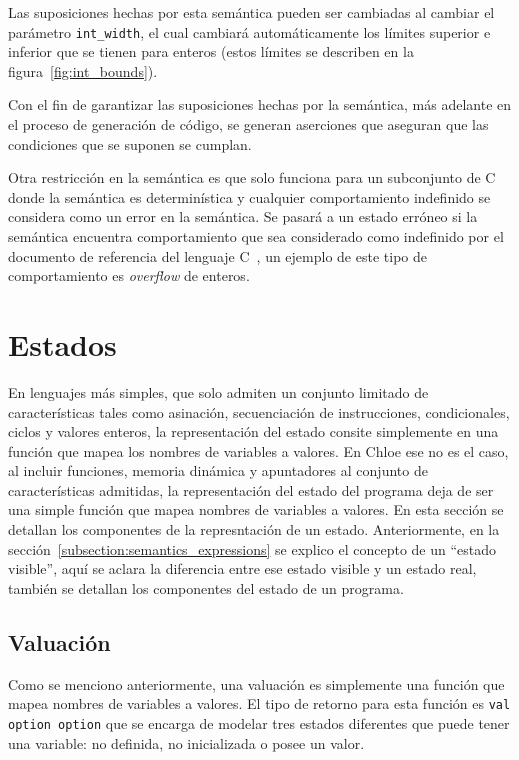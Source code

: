 Las suposiciones hechas por esta semántica pueden ser cambiadas al cambiar el parámetro \verb|int_width|, el cual cambiará automáticamente los límites superior e inferior que se tienen para enteros (estos límites se describen en la figura~\ref{fig:int_bounds}).

Con el fin de garantizar las suposiciones hechas por la semántica, más adelante en el proceso de generación de código, se generan aserciones que aseguran que las condiciones que se suponen se cumplan.

Otra restricción en la semántica es que solo funciona para un subconjunto de C donde la semántica es determinística y cualquier comportamiento indefinido se considera como un error en la semántica.
Se pasará a un estado erróneo si la semántica encuentra comportamiento que sea considerado como indefinido por el documento de referencia del lenguaje C~\cite{c99}, un ejemplo de este tipo de comportamiento es \textit{overflow} de enteros.


\section{Estados}\label{section:states}

En lenguajes más simples, que solo admiten un conjunto limitado de características tales como asinación, secuenciación de instrucciones, condicionales, ciclos y valores enteros, la representación del estado consite simplemente en una función que mapea los nombres de variables a valores.
En Chloe ese no es el caso, al incluir funciones, memoria dinámica y apuntadores al conjunto de características admitidas, la representación del estado del programa deja de ser una simple función que mapea nombres de variables a valores.
En esta sección se detallan los componentes de la represntación de un estado.
Anteriormente, en la sección~\ref{subsection:semantics_expressions} se explico el concepto de un ``estado visible'', aquí se aclara la diferencia entre ese estado visible y un estado real, también se detallan los componentes del estado de un programa.

\subsection{Valuación}\label{subsection:valuation}

Como se menciono anteriormente, una valuación es simplemente una función que mapea nombres de variables a valores.
El tipo de retorno para esta función es \verb|val option option| que se encarga de modelar tres estados diferentes que puede tener una variable: no definida, no inicializada o posee un valor.


